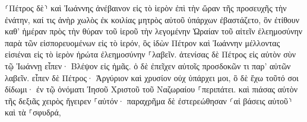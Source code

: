\documentclass{openreader}
\begin{document}
⸂Πέτρος δὲ⸃ καὶ Ἰωάννης ἀνέβαινον εἰς τὸ ἱερὸν ἐπὶ τὴν ὥραν τῆς προσευχῆς τὴν ἐνάτην, 
καί τις ἀνὴρ χωλὸς ἐκ κοιλίας μητρὸς αὐτοῦ ὑπάρχων ἐβαστάζετο, ὃν ἐτίθουν καθ’ ἡμέραν πρὸς τὴν θύραν τοῦ ἱεροῦ τὴν λεγομένην Ὡραίαν τοῦ αἰτεῖν ἐλεημοσύνην παρὰ τῶν εἰσπορευομένων εἰς τὸ ἱερόν, 
ὃς ἰδὼν Πέτρον καὶ Ἰωάννην μέλλοντας εἰσιέναι εἰς τὸ ἱερὸν ἠρώτα ἐλεημοσύνην ⸀λαβεῖν. 
ἀτενίσας δὲ Πέτρος εἰς αὐτὸν σὺν τῷ Ἰωάννῃ εἶπεν· Βλέψον εἰς ἡμᾶς. 
ὁ δὲ ἐπεῖχεν αὐτοῖς προσδοκῶν τι παρ’ αὐτῶν λαβεῖν. 
εἶπεν δὲ Πέτρος· Ἀργύριον καὶ χρυσίον οὐχ ὑπάρχει μοι, ὃ δὲ ἔχω τοῦτό σοι δίδωμι· ἐν τῷ ὀνόματι Ἰησοῦ Χριστοῦ τοῦ Ναζωραίου ⸀περιπάτει. 
καὶ πιάσας αὐτὸν τῆς δεξιᾶς χειρὸς ἤγειρεν ⸀αὐτόν· παραχρῆμα δὲ ἐστερεώθησαν ⸂αἱ βάσεις αὐτοῦ⸃ καὶ τὰ ⸀σφυδρά, 
\end{document}
